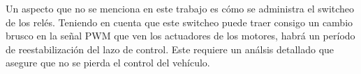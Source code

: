 Un aspecto que no se menciona en este trabajo es cómo se administra el switcheo de los relés. Teniendo en cuenta que este switcheo puede traer consigo un cambio brusco en la señal PWM que ven los actuadores de los motores, habrá un período de reestabilización del lazo de control. Este requiere un análsis detallado que asegure que no se pierda el control del vehículo.




